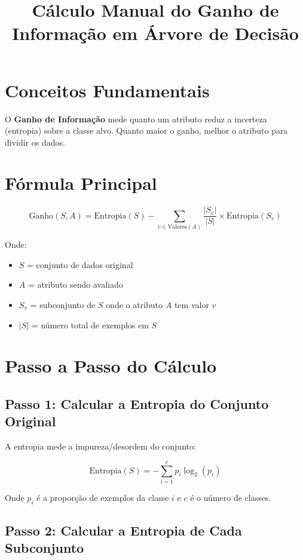 \documentclass[12pt,a4paper]{article}
\title{Cálculo Manual do Ganho de Informação em Árvore de Decisão}
\author{}
\date{}
\begin{document}
\maketitle

\section{Conceitos Fundamentais}

O \textbf{Ganho de Informação} mede quanto um atributo reduz a incerteza (entropia) sobre a classe alvo. Quanto maior o ganho, melhor o atributo para dividir os dados.

\section{Fórmula Principal}

\begin{equation}
\text{Ganho}(S, A) = \text{Entropia}(S) - \sum_{v \in \text{Valores}(A)} \frac{|S_v|}{|S|} \times \text{Entropia}(S_v)
\end{equation}

Onde:
\begin{itemize}
    \item $S$ = conjunto de dados original
    \item $A$ = atributo sendo avaliado
    \item $S_v$ = subconjunto de $S$ onde o atributo $A$ tem valor $v$
    \item $|S|$ = número total de exemplos em $S$
\end{itemize}

\section{Passo a Passo do Cálculo}

\subsection{Passo 1: Calcular a Entropia do Conjunto Original}

A entropia mede a impureza/desordem do conjunto:

\begin{equation}
\text{Entropia}(S) = -\sum_{i=1}^{c} p_i \log_2(p_i)
\end{equation}

Onde $p_i$ é a proporção de exemplos da classe $i$ e $c$ é o número de classes.

\subsection{Passo 2: Calcular a Entropia de Cada Subconjunto}
\end{document}
